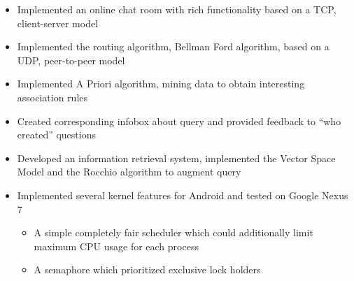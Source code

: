 \documentclass[letterpaper,10pt]{resume}
\begin{document}
	\begin{body}
		\begin{itemize}
		\item Implemented an online chat room with rich functionality based on a TCP, client-server model
		\item Implemented the routing algorithm, Bellman Ford algorithm, based on a UDP, peer-to-peer model
		\end{itemize}
		
		
		\begin{itemize}
		\item Implemented A Priori algorithm, mining data to obtain interesting association rules
		\item Created corresponding infobox about query and provided feedback to ``who created'' questions
		\item Developed an information retrieval system, implemented the Vector Space Model and the Rocchio algorithm to augment query
		\end{itemize}
		

		
		
		\begin{itemize}
		\item Implemented several kernel features for Android and tested on Google Nexus 7
			\begin{itemize}
			\item A simple completely fair scheduler which could additionally limit maximum CPU usage for each process
			\item A semaphore which prioritized exclusive lock holders
			\end{itemize}
		\end{itemize}
	\end{body}
\end{document}

